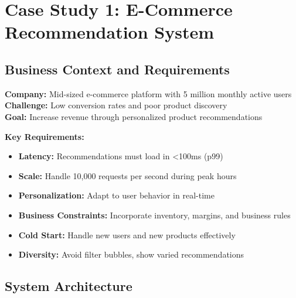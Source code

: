 \section{Case Study 1: E-Commerce Recommendation System}

\subsection{Business Context and Requirements}

\textbf{Company:} Mid-sized e-commerce platform with 5 million monthly active users\\
\textbf{Challenge:} Low conversion rates and poor product discovery\\
\textbf{Goal:} Increase revenue through personalized product recommendations

\textbf{Key Requirements:}

\begin{itemize}
    \item \textbf{Latency:} Recommendations must load in <100ms (p99)
    \item \textbf{Scale:} Handle 10,000 requests per second during peak hours
    \item \textbf{Personalization:} Adapt to user behavior in real-time
    \item \textbf{Business Constraints:} Incorporate inventory, margins, and business rules
    \item \textbf{Cold Start:} Handle new users and new products effectively
    \item \textbf{Diversity:} Avoid filter bubbles, show varied recommendations
\end{itemize}

\subsection{System Architecture}

